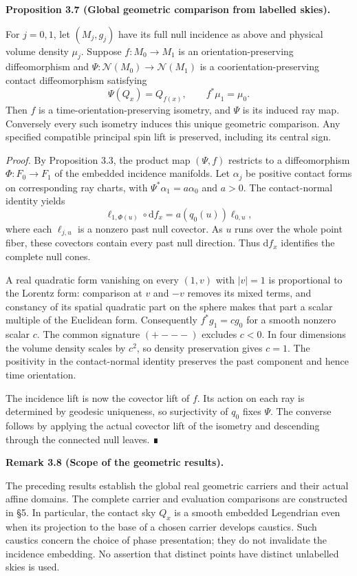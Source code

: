 \documentclass[
  english,
  11pt,
  reqno]{amsart}
\makeatletter
\newcommand{\pandocstatementheading}[1]{%
  \par\addpenalty{\@beginparpenalty}%
  \addvspace{.5\baselineskip plus .2\baselineskip minus .2\baselineskip}%
  {\normalfont\bfseries #1\par}%
  \nobreak\@afterindenttrue\@afterheading
}
\makeatother
\begin{document}
\pandocstatementheading{\protect{}\label{prop:global-geometric-recognition}Proposition 3.7 (Global geometric comparison from labelled skies).}

For \(j=0,1\), let \((M_j,g_j)\) have its full null incidence as above
and physical volume density \(\mu_j\). Suppose \(f:M_0\to M_1\) is an
orientation-preserving diffeomorphism and
\(\Psi:\mathcal N(M_0)\to\mathcal N(M_1)\) is a coorientation-preserving
contact diffeomorphism satisfying \[
\Psi(Q_x)=Q_{f(x)},\qquad f^*\mu_1=\mu_0.
\] Then \(f\) is a time-orientation-preserving isometry, and \(\Psi\) is
its induced ray map. Conversely every such isometry induces this unique
geometric comparison. Any specified compatible principal spin lift is
preserved, including its central sign.

\emph{Proof.} By Proposition 3.3, the product map \((\Psi,f)\) restricts
to a diffeomorphism \(\Phi:F_0\to F_1\) of the embedded incidence
manifolds. Let \(\alpha_j\) be positive contact forms on corresponding
ray charts, with \(\Psi^*\alpha_1=a\alpha_0\) and \(a>0\). The
contact-normal identity yields \[
\ell_{1,\Phi(u)}\circ\mathrm df_x
=a(q_0(u))\ell_{0,u},
\] where each \(\ell_{j,u}\) is a nonzero past null covector. As \(u\)
runs over the whole point fiber, these covectors contain every past null
direction. Thus \(\mathrm df_x\) identifies the complete null cones.

A real quadratic form vanishing on every \((1,v)\) with \(|v|=1\) is
proportional to the Lorentz form: comparison at \(v\) and \(-v\) removes
its mixed terms, and constancy of its spatial quadratic part on the
sphere makes that part a scalar multiple of the Euclidean form.
Consequently \(f^*g_1=cg_0\) for a smooth nonzero scalar \(c\). The
common signature \((+---)\) excludes \(c<0\). In four dimensions the
volume density scales by \(c^2\), so density preservation gives \(c=1\).
The positivity in the contact-normal identity preserves the past
component and hence time orientation.

The incidence lift is now the covector lift of \(f\). Its action on each
ray is determined by geodesic uniqueness, so surjectivity of \(q_0\)
fixes \(\Psi\). The converse follows by applying the actual covector
lift of the isometry and descending through the connected null leaves. ∎

\pandocstatementheading{\protect{}\label{rem:global-geometry-proof-scope}Remark 3.8 (Scope of the geometric results).}

The preceding results establish the global real geometric carriers and
their actual affine domains. The complete carrier and evaluation
comparisons are constructed in §5. In particular, the contact sky
\(Q_x\) is a smooth embedded Legendrian even when its projection to the
base of a chosen carrier develops caustics. Such caustics concern the
choice of phase presentation; they do not invalidate the incidence
embedding. No assertion that distinct points have distinct unlabelled
skies is used.
\end{document}
